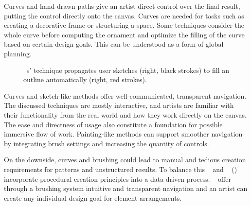 Curves and hand-drawn paths give an artist direct control over the final result, putting the control directly onto the canvas. Curves are needed for tasks such as creating a decorative frame or structuring a space. Some techniques consider the whole curve before computing the ornament and optimize the filling of the curve based on certain design goals. This can be understood as a form of global planning. 

\begin{figure}
    \centering
    \caption{\label{fig:xing_2014_apr}\citeauthor*{xing_2014_apr}~\cite{xing_2014_apr}s' technique propagates user sketches (right, black strokes) to fill an outline automatically (right, red strokes).}
\end{figure}

Curves and sketch-like methods offer well-communicated, transparent navigation. The discussed techniques are mostly interactive, and artists are familiar with their functionality from the real world and how they work directly on the canvas. The ease and directness of usage also constitute a foundation for possible immersive flow of work. Painting-like methods can support smoother navigation by integrating brush settings and increasing the quantity of controls. 

On the downside, curves and brushing could lead to manual and tedious creation requirements for patterns and unstructured results. To balance this \citeauthor*{kazi_2012_vit}~\cite{kazi_2012_vit} and \citeauthor*{xing_2014_apr}~\cite{xing_2014_apr} () incorporate procedural creation principles into a data-driven process. \citeauthor*{hsu_2020_aef}~\cite{hsu_2020_aef} offer through a brushing system intuitive and transparent navigation and an artist can create any individual design goal for element arrangements. 

